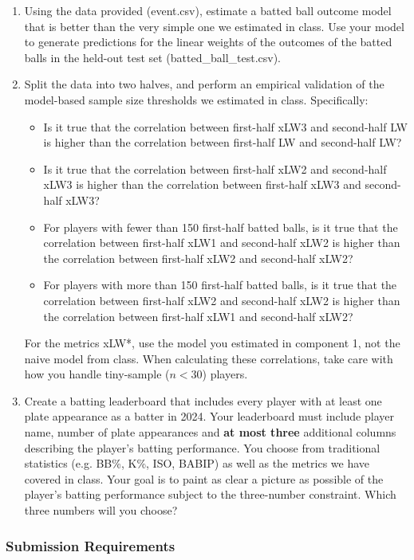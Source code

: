 \documentclass{article}
\begin{document}
      \begin{enumerate}
        \item Using the data provided (event.csv), estimate a batted ball outcome model that is better than the very simple one we estimated in class. Use your model to generate predictions for the linear weights of the outcomes of the batted balls in the held-out test set (batted\_ball\_test.csv).
        \item Split the data into two halves, and perform an empirical validation of the model-based sample size thresholds we estimated in class. Specifically:
        \begin{itemize}
          \item Is it true that the correlation between first-half xLW3 and second-half LW is higher than the correlation between first-half LW and second-half LW?
          \item Is it true that the correlation between first-half xLW2 and second-half xLW3 is higher than the correlation between first-half xLW3 and second-half xLW3?
          \item For players with fewer than 150 first-half batted balls, is it true that the correlation between first-half xLW1 and second-half xLW2 is higher than the correlation between first-half xLW2 and second-half xLW2?
          \item For players with more than 150 first-half batted balls, is it true that the correlation between first-half xLW2 and second-half xLW2 is higher than the correlation between first-half xLW1 and second-half xLW2?
        \end{itemize}
        For the metrics xLW*, use the model you estimated in component 1, not the naive model from class. When calculating these correlations, take care with how you handle tiny-sample ($n < 30$) players.
        \item Create a batting leaderboard that includes every player with at least one plate appearance as a batter in 2024. Your leaderboard must include player name, number of plate appearances and {\bf at most three} additional columns describing the player's batting performance. You choose from traditional statistics (e.g. BB\%, K\%, ISO, BABIP) as well as the metrics we have covered in class. Your goal is to paint as clear a picture as possible of the player's batting performance subject to the three-number constraint. Which three numbers will you choose?
      \end{enumerate}

      \subsubsection*{\sc Submission Requirements}
\end{document}
